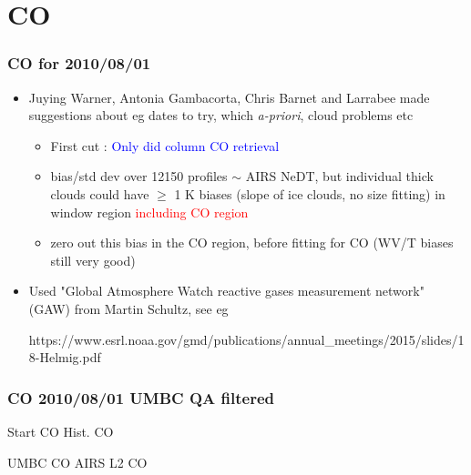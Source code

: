 \documentclass[10pt,t]{beamer}
\begin{document}
\section{CO}
\begin{frame}
  \frametitle{CO for 2010/08/01}
  \begin{itemize}
  \item Juying Warner,  Antonia Gambacorta,  Chris Barnet and Larrabee made suggestions about eg
    dates to try, which \emph{a-priori}, cloud problems etc
    \begin{itemize}
    \item First cut : \textcolor{blue}{Only did column CO retrieval}
    \item bias/std dev over 12150 profiles $\sim$  AIRS NeDT, but individual thick clouds could have
          $\geq$ 1 K biases (slope of ice clouds, no size fitting) in window region \textcolor{red}{including
	  CO region}
    \item zero out this bias in the CO region, before fitting for CO (WV/T biases still very good)
    \end{itemize}
  \item Used "Global Atmosphere Watch reactive gases measurement network"
    (GAW) from Martin Schultz, see eg
    \begin{small} https://www.esrl.noaa.gov/gmd/publications/annual\_meetings/2015/slides/18-Helmig.pdf \end{small}
  \end{itemize}
\end{frame}
\begin{frame}
  \frametitle{CO 2010/08/01 UMBC QA filtered}

\vspace{-0.15in}  
  \footnotesize Start CO  \hspace{2.0in} \footnotesize Hist. CO\\
\vspace{-0.05in}      
  \begin{center}
  \end{center}

\vspace{-0.15in}  
  \footnotesize UMBC CO \hspace{2.0in} \footnotesize AIRS L2 CO\\
\vspace{-0.05in}      
  \begin{center}
  \end{center}

\end{frame}
\end{document}
